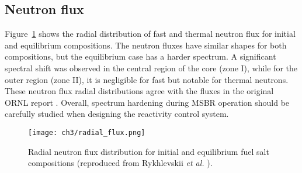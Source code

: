\subsection{Neutron flux}
Figure~\ref{fig:radial_flux} shows the radial distribution of fast and thermal 
neutron flux for initial and equilibrium compositions. The neutron fluxes have 
similar shapes for both compositions, but the equilibrium case has a harder 
spectrum. A significant spectral shift was observed in the central region of 
the core (zone I), while for the outer region (zone II), it is negligible for 
fast but notable for thermal neutrons. These neutron flux radial distributions 
agree with the fluxes in the original ORNL report 
\cite{robertson_conceptual_1971}. 
Overall, spectrum hardening during \gls{MSBR} operation should be carefully 
studied when designing the reactivity control system.
\begin{figure}[ht!] %
	\texttt{[image: ch3/radial\_flux.png]}
	\caption{Radial neutron flux distribution for initial and equilibrium fuel 
	salt compositions (reproduced from Rykhlevskii \emph{et al.} 
	\cite{rykhlevskii_modeling_2019}).}
	\label{fig:radial_flux}
\end{figure}

